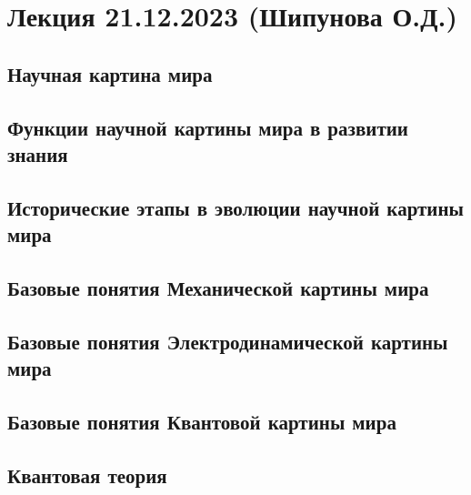 \documentclass[main.tex]{subfiles}
\begin{document}
\section{Лекция 21.12.2023 (Шипунова О.Д.)}


\subsection{Научная картина мира}


\subsection{Функции научной картины мира в развитии знания}


\subsection{Исторические этапы в эволюции научной картины мира}


\subsection{Базовые понятия Механической картины мира}


\subsection{Базовые понятия Электродинамической картины мира}



\subsection{Базовые понятия Квантовой картины мира}


\subsection{Квантовая теория}

\end{document}
